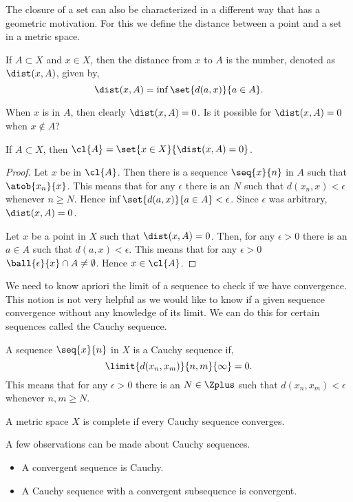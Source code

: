 The closure of a set can also be characterized in a different way that has a geometric motivation. For this we
define the distance between a point and a set in a metric space.
\begin{Definition}[name=Distance]
    If $A \subset X$ and $x \in X$, then the distance from $x$ to $A$ is the number, denoted as $\dist(x,A)$,
    given by,
    \[\dist(x,A) = \inf\set{d(a,x)}{a\in A}.\]
\end{Definition}
When $x$ is in $A$, then clearly $\dist(x,A) = 0$. Is it possible for $\dist(x,A) = 0$ when $x\not\in A$?
\begin{Proposition}
    If $A \subset X$, then $\cl{A} = \set{x \in X}{\dist(x,A) = 0}$.
\end{Proposition}
\begin{proof}
    Let $x$ be in $\cl{A}$. Then there is a sequence $\seq{x}{n}$ in $A$ such that $\atob{x_n}{x}$. This means
    that for any $\epsilon$ there is an $N$ such that $d(x_n,x) < \epsilon$ whenever $n \geq N$. Hence
    $\inf\set{d(a,x)}{a\in A} < \epsilon$. Since $\epsilon$ was arbitrary, $\dist(x,A) = 0$.

    Let $x$ be a point in $X$ such that $\dist(x,A) = 0$. Then, for any $\epsilon > 0$ there is an $a \in A$
    such that $d(a,x) < \epsilon$. This means that for any $\epsilon > 0$ $\ball{\epsilon}{x} \cap A \neq
    \emptyset$. Hence $x \in \cl{A}$.
\end{proof}
We need to know apriori the limit of a sequence to check if we have convergence. This notion is not very
helpful as we would like to know if a given sequence convergence without any knowledge of its limit. We can do
this for certain sequences called the Cauchy sequence.
\begin{Definition}[name=Cauchy sequence]
    A sequence $\seq{x}{n}$ in $X$ is a Cauchy sequence if,
    \[\limit{d(x_n,x_m)}{n,m}{\infty} = 0.\]
    This means that for any $\epsilon > 0$ there is an $N\in\Zplus$ such that $d(x_n,x_m) < \epsilon$ whenever
    $n,m \geq N$.
\end{Definition}
\begin{Definition}[name=Complete metric space]
    A metric space $X$ is complete if every Cauchy sequence converges.
\end{Definition}
\begin{Remark}
    A few observations can be made about Cauchy sequences.
    \begin{itemize}
	\item
	    A convergent sequence is Cauchy.
	\item
	    A Cauchy sequence with a convergent subsequence is convergent.
    \end{itemize}
\end{Remark}
